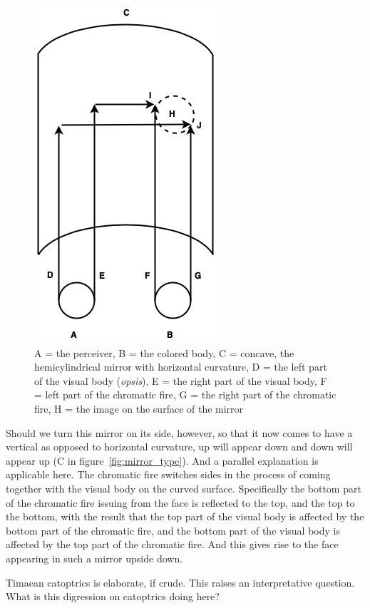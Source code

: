 \begin{figure}[htbp]
	\centering
		\includegraphics[scale=0.4]{graphics/hemicylinder.png}
	\caption{A = the perceiver, B = the colored body, C = concave, the hemicylindrical mirror with horizontal curvature, D = the left part of the visual body (\emph{opsis}), E = the right part of the visual body, F = left part of the chromatic fire, G = the right part of the chromatic fire, H = the image on the surface of the mirror}
	\label{fig:hemicylinder}
\end{figure}

Should we turn this mirror on its side, however, so that it now comes to have a vertical as opposed to horizontal curvature, up will appear down and down will appear up (C in figure~\ref{fig:mirror_type}). And a parallel explanation is applicable here. The chromatic fire switches sides in the process of coming together with the visual body on the curved surface. Specifically the bottom part of the chromatic fire issuing from the face is reflected to the top, and the top to the bottom, with the result that the top part of the visual body is affected by the bottom part of the chromatic fire, and the bottom part of the visual body is affected by the top part of the chromatic fire. And this gives rise to the face appearing in such a mirror upside down.

Timaean catoptrics is elaborate, if crude. This raises an interpretative question. What is this digression on catoptrics doing here? 


